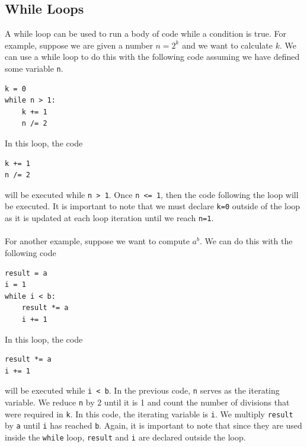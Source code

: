 \documentclass{article}
\begin{document}
\subsection{While Loops}
A while loop can be used to run a body of code while a condition is true. For example, suppose we are given a number $n = 2^k$ and we want to calculate $k$. We can use a while loop to do this with the following code assuming we have defined some variable \texttt{n}.
\begin{verbatim}
k = 0
while n > 1:
    k += 1
    n /= 2
\end{verbatim}
In this loop, the code
\begin{verbatim}
k += 1
n /= 2
\end{verbatim}
will be executed while \texttt{n > 1}. Once \texttt{n <= 1}, then the code following the loop will be executed. It is important to note that we must declare \texttt{k=0} outside of the loop as it is updated at each loop iteration until we reach \texttt{n=1}.\\\\
For another example, suppose we want to compute $a^b$. We can do this with the following code
\begin{verbatim}
result = a
i = 1
while i < b:
    result *= a
    i += 1
\end{verbatim}
In this loop, the code
\begin{verbatim}
result *= a
i += 1
\end{verbatim}
will be executed while \texttt{i < b}. In the previous code, \texttt{n} serves as the iterating variable. We reduce \texttt{n} by 2 until it is 1 and count the number of divisions that were required in \texttt{k}. In this code, the iterating variable is \texttt{i}. We multiply \texttt{result} by \texttt{a} until \texttt{i} has reached \texttt{b}. Again, it is important to note that since they are used inside the \texttt{while} loop, \texttt{result} and \texttt{i} are declared outside the loop.
\end{document}
